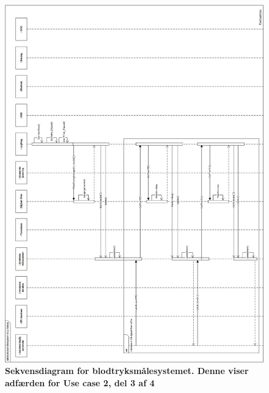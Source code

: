 \begin{figure}[H]
\includegraphics[width =1.0\textwidth , center]{billeder/sdUC2_3}
\caption{\textbf{Sekvensdiagram for blodtryksmålesystemet. Denne viser adfærden for Use case 2, del 3 af 4}}
\end{figure}
